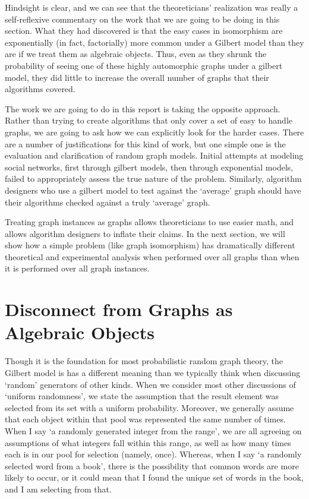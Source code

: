 Hindsight is clear, and we can see that the theoreticians' realization was really a self-reflexive commentary on the work that we are going to be doing in this section.
What they had discovered is that the easy cases in isomorphism are exponentially (in fact, factorially) more common under a Gilbert model than they are if we treat them as algebraic objects.
Thus, even as they shrunk the probability of seeing one of these highly automorphic graphs under a gilbert model, they did little to increase the overall number of graphs that their algorithms covered.

The work we are going to do in this report is taking the opposite approach.
Rather than trying to create algorithms that only cover a set of easy to handle graphs, we are going to ask how we can explicitly look for the harder cases.
There are a number of justifications for this kind of work, but one simple one is the evaluation and clarification of random graph models.
Initial attempts at modeling social networks, first through gilbert models, then through exponential models, failed to appropriately assess the true nature of the problem.
Similarly, algorithm designers who use a gilbert model to test against the `average' graph should have their algorithms checked against a truly `average' graph.

Treating graph instances as graphs allows theoreticians to use easier math, and allows algorithm designers to inflate their claims.
In the next section, we will show how a simple problem (like graph isomorphism) has dramatically different theoretical and experimental analysis when performed over all graphs than when it is performed over all graph instances.


\section{Disconnect from Graphs as Algebraic Objects}

Though it is the foundation for most probabilistic random graph theory, the Gilbert model is has a different meaning than we typically think when discussing `random' generators of other kinds.
When we consider most other discussions of `uniform randomness', we state the assumption that the result element was selected from its set with a uniform probability.
Moreover, we generally assume that each object within that pool was represented the same number of times.
When I say `a randomly generated integer from the range', we are all agreeing on assumptions of what integers fall within this range, as well as how many times each is in our pool for selection (namely, once). 
Whereas, when I say `a randomly selected word from a book', there is the possibility that common words are more likely to occur, or it could mean that I found the unique set of words in the book, and I am selecting from that.

